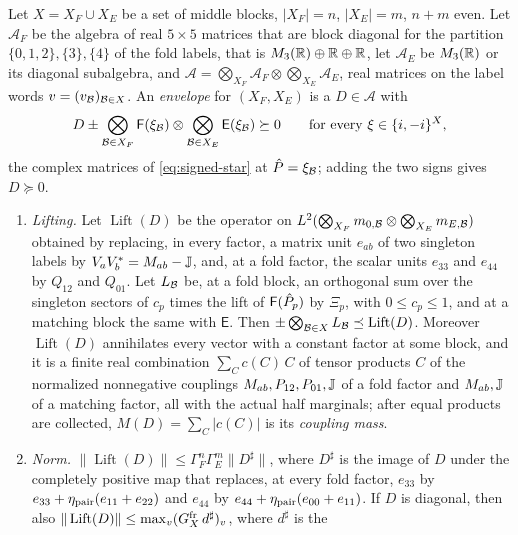 \begin{lemma}\label{lem:oct24:mask-schur}
Let $X=X_F\cup X_E$ be a set of middle blocks, $|X_F|=n$, $|X_E|=m$, $n+m$ even. Let
$\mathcal A_F$ be the algebra of real $5\times5$ matrices that are block diagonal for
the partition $\{0,1,2\},\{3\},\{4\}$ of the fold labels, that is
$M_3(\mathbb R)\oplus\mathbb R\oplus\mathbb R$, let $\mathcal A_E$ be $M_3(\mathbb R)$ or its diagonal subalgebra,
and $\mathcal A=\bigotimes_{X_F}\mathcal A_F\otimes\bigotimes_{X_E}\mathcal A_E$, real matrices
on the label words $v=(v_\mathcal B)_{\mathcal B\in X}$. An \emph{envelope} for $(X_F,X_E)$ is a
$D\in\mathcal A$ with
\begin{equation}\label{eq:matrix-envelope}
 D\pm\bigotimes_{\mathcal B\in X_F}\mathsf F(\xi_\mathcal B)\otimes\bigotimes_{\mathcal B\in X_E}
 \mathsf E(\xi_\mathcal B)\succeq0\qquad\text{for every }\xi\in\{i,-i\}^X ,
\end{equation}
the complex matrices of \eqref{eq:signed-star} at $\hat P=\xi_\mathcal B$; adding the two
signs gives $D\succeq0$.
\begin{enumerate}[label=(\alph*)]
\item \emph{Lifting.} Let $\operatorname{Lift}(D)$ be the operator on
 $L^2(\bigotimes_{X_F}m_{0,\mathcal B}\otimes\bigotimes_{X_E}m_{E,\mathcal B})$ obtained by replacing,
 in every factor, a matrix unit $e_{ab}$ of two singleton labels by
 $V_aV_b^*=M_{ab}-\mathbb J$, and, at a fold factor, the scalar units $e_{33}$
 and $e_{44}$ by $Q_{12}$ and $Q_{01}$. Let $L_\mathcal B$ be, at a fold block, an orthogonal
 sum over the singleton sectors of $c_p$ times the lift of $\mathsf F(\hat P_p)$ by
 $\Xi_p$, with $0\le c_p\le1$, and at a matching block the same with $\mathsf E$. Then
 $\pm\bigotimes_{\mathcal B\in X}L_\mathcal B\preceq\operatorname{Lift}(D)$. Moreover
 $\operatorname{Lift}(D)$ annihilates every vector with a constant factor at some
 block, and it is a finite real combination $\sum_Cc(C)\,C$ of tensor products $C$ of
 the normalized nonnegative couplings $M_{ab},P_{12},P_{01},\mathbb J$ of a fold factor
 and $M_{ab},\mathbb J$ of a matching factor, all with the actual half marginals; after
 equal products are collected, $M(D)=\sum_C|c(C)|$ is its \emph{coupling mass}.
\item \emph{Norm.} $\|\operatorname{Lift}(D)\|\le\Gamma_F^n\Gamma_E^m\|D^\sharp\|$, where
 $D^\sharp$ is the image of $D$ under the completely positive map that replaces, at
 every fold factor, $e_{33}$ by $e_{33}+\eta_{\rm pair}(e_{11}+e_{22})$ and $e_{44}$ by
 $e_{44}+\eta_{\rm pair}(e_{00}+e_{11})$. If $D$ is diagonal, then also
 $\|\operatorname{Lift}(D)\|\le\max_v(G^{\rm fr}_X\,d^\sharp)_v$, where $d^\sharp$ is the

\end{enumerate}
\end{lemma}
